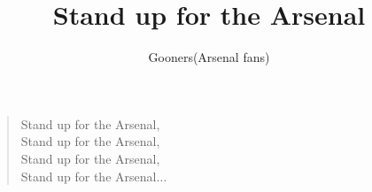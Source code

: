 \documentclass[a4paper,12pt]{article}
\title{Stand up for the Arsenal}
\author{Gooners(Arsenal fans)}
\date{}
\begin{document}
	
	\maketitle
	
	\begin{verse}
		
		Stand up for the Arsenal, \\
		Stand up for the Arsenal, \\
		Stand up for the Arsenal, \\
		Stand up for the Arsenal$\ldots$
		
	\end{verse}
	
\end{document}
